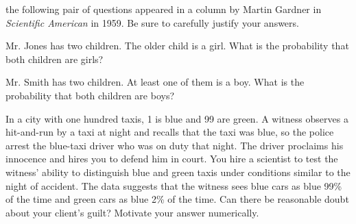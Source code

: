 \documentclass[a4paper,10pt,landscape,twocolumn]{scrartcl}
\begin{document}
\begin{exercise}
	the following pair of questions appeared in a column by Martin Gardner in \emph{Scientific American} in 1959. 	Be sure to carefully justify your answers.
	
	\begin{subex}
	Mr. Jones has two children. The older child is a girl. What is the probability that both children are girls?
	\end{subex}
	
	\begin{subex}
	Mr. Smith has two children. At least one of them is a boy. What is the probability that both children are boys?
	\end{subex}
	
\end{exercise}

\begin{exercise}[Taxi's]
	In a city with one hundred taxis, 1 is blue and 99 are green. A witness observes a hit-and-run by a taxi at night and recalls that the taxi was blue, so the police arrest the blue-taxi driver who was on duty that night. The driver proclaims his innocence and hires you to defend him in court. You hire a scientist to test the witness' ability to distinguish blue and green taxis under conditions similar to the night of accident. The data suggests that the witness sees blue cars as blue 99\% of the time and green cars as blue 2\% of the time. Can there be reasonable doubt about your client's guilt? Motivate your answer numerically.
\end{exercise}

\vfill
{}
\end{document}
